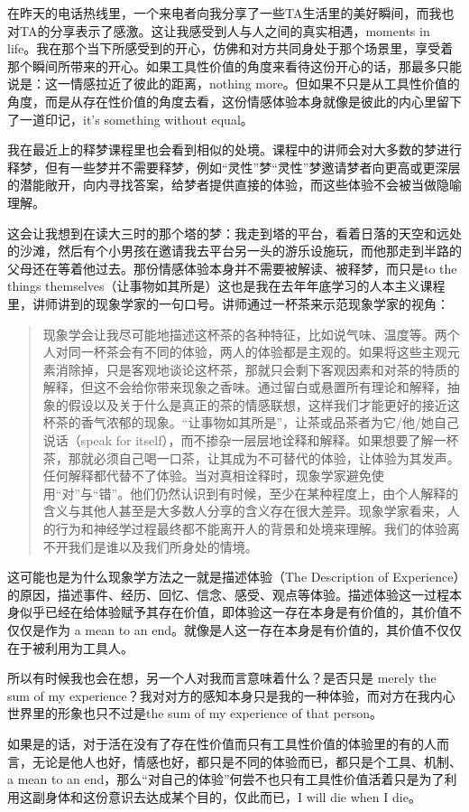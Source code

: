 在昨天的电话热线里，一个来电者向我分享了一些TA生活里的美好瞬间，而我也对TA的分享表示了感激。这让我感受到人与人之间的真实相遇，moments in life。我在那个当下所感受到的开心，仿佛和对方共同身处于那个场景里，享受着那个瞬间所带来的开心。如果工具性价值的角度来看待这份开心的话，那最多只能说是：这一情感拉近了彼此的距离，nothing more。但如果不只是从工具性价值的角度，而是从存在性价值的角度去看，这份情感体验本身就像是彼此的内心里留下了一道印记，it's something without equal。

我在最近上的释梦课程里也会看到相似的处境。课程中的讲师会对大多数的梦进行释梦，但有一些梦并不需要释梦，例如“灵性”梦\pozhehao{}“灵性”梦邀请梦者向更高或更深层的潜能敞开，向内寻找答案，给梦者提供直接的体验，而这些体验不会被当做隐喻理解。

这会让我想到在读大三时的那个塔的梦：我走到塔的平台，看着日落的天空和远处的沙滩，然后有个小男孩在邀请我去平台另一头的游乐设施玩，而他那走到半路的父母还在等着他过去。那份情感体验本身并不需要被解读、被释梦，而只是to the things themselves（让事物如其所是）\pozhehao{}这也是我在去年年底学习的人本主义课程里，讲师讲到的现象学家的一句口号。讲师通过一杯茶来示范现象学家的视角：

\blockquote{现象学会让我尽可能地描述这杯茶的各种特征，比如说气味、温度等。两个人对同一杯茶会有不同的体验，两人的体验都是主观的。如果将这些主观元素消除掉，只是客观地谈论这杯茶，那就只会剩下客观因素和对茶的特质的解释，但这不会给你带来现象之香味。通过留白或悬置所有理论和解释，抽象的假设以及关于什么是真正的茶的情感联想，这样我们才能更好的接近这杯茶的香气浓郁的现象。“让事物如其所是”，让茶或品茶者为它/他/她自己说话（speak for itself），而不掺杂一层层地诠释和解释。如果想要了解一杯茶，那就必须自己喝一口茶，让其成为不可替代的体验，让体验为其发声。任何解释都代替不了体验。当对真相诠释时，现象学家避免使用“对”与“错”。他们仍然认识到有时候，至少在某种程度上，由个人解释的含义与其他人甚至是大多数人分享的含义存在很大差异。现象学家看来，人的行为和神经学过程最终都不能离开人的背景和处境来理解。我们的体验离不开我们是谁以及我们所身处的情境。}

这可能也是为什么现象学方法之一就是描述体验（The Description of Experience）的原因，描述事件、经历、回忆、信念、感受、观点等体验。描述体验这一过程本身似乎已经在给体验赋予其存在价值，即体验这一存在本身是有价值的，其价值不仅仅是作为 a mean to an end。就像是人这一存在本身是有价值的，其价值不仅仅在于被利用为工具人。

所以有时候我也会在想，另一个人对我而言意味着什么？是否只是 merely the sum of my experience？我对对方的感知本身只是我的一种体验，而对方在我内心世界里的形象也只不过是the sum of my experience of that person。

如果是的话，对于活在没有了存在性价值而只有工具性价值的体验里的有的人而言，无论是他人也好，情感也好，都只是不同的体验而已，都只是个工具、机制、a mean to an end，那么“对自己的体验”何尝不也只有工具性价值\pozhehao{}活着只是为了利用这副身体和这份意识去达成某个目的，仅此而已，I will die when I die。


